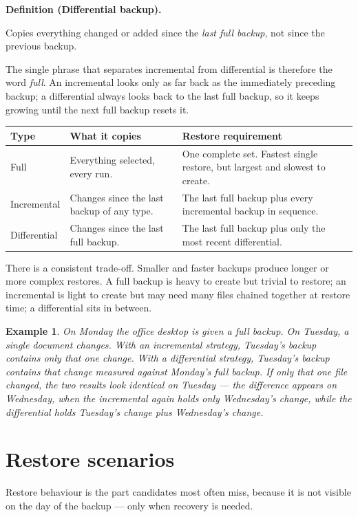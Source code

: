 \documentclass[11pt]{article}
\newtheorem{example}{Example}[section]
\newenvironment{definitionbox}[1]{%
  \par\noindent\textbf{Definition (#1).}\ \itshape
}{\par\vspace{0.3em}}
\begin{document}
\begin{definitionbox}{Differential backup}
Copies everything changed or added since the \emph{last full backup}, not
since the previous backup.
\end{definitionbox}

The single phrase that separates incremental from differential is therefore
the word \emph{full}. An incremental looks only as far back as the
immediately preceding backup; a differential always looks back to the last
full backup, so it keeps growing until the next full backup resets it.

\begin{center}
\begin{tabular}{p{}p{}p{}}
\toprule
\textbf{Type} & \textbf{What it copies} & \textbf{Restore requirement}\\
\midrule
Full & Everything selected, every run. & One complete set. Fastest single restore, but largest and slowest to create.\\
Incremental & Changes since the last backup of any type. & The last full backup plus every incremental backup in sequence.\\
Differential & Changes since the last full backup. & The last full backup plus only the most recent differential.\\
\bottomrule
\end{tabular}
\end{center}

There is a consistent trade-off. Smaller and faster backups produce longer or
more complex restores. A full backup is heavy to create but trivial to
restore; an incremental is light to create but may need many files chained
together at restore time; a differential sits in between.

\begin{example}
On Monday the office desktop is given a full backup. On Tuesday, a single
document changes. With an incremental strategy, Tuesday's backup contains
only that one change. With a differential strategy, Tuesday's backup contains
that change measured against Monday's full backup. If only that one file
changed, the two results look identical on Tuesday --- the difference appears
on Wednesday, when the incremental again holds only Wednesday's change, while
the differential holds Tuesday's change plus Wednesday's change.
\end{example}

\section{Restore scenarios}
Restore behaviour is the part candidates most often miss, because it is not
visible on the day of the backup --- only when recovery is needed.
\end{document}
